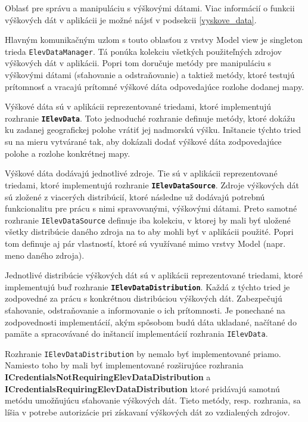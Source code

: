 Oblasť pre správu a manipuláciu s výškovými dátami. Viac informácií o funkcii výškových dát v aplikácii je možné nájsť v podsekcii \ref{vyskove_data}. 

Hlavným komunikačným uzlom s touto oblasťou z vrstvy Model view je singleton trieda \texttt{ElevDataManager}. Tá ponúka kolekciu všetkých použiteľných zdrojov výškových dát v aplikácii. Popri tom doručuje metódy pre manipuláciu s výškovými dátami (sťahovanie a odstraňovanie) a taktiež metódy, ktoré testujú prítomnosť a vracajú prítomné výškové dáta odpovedajúce rozlohe dodanej mapy.

\bigskip

Výškové dáta sú v aplikácii reprezentované triedami, ktoré implementujú rozhranie \textbf{\texttt{IElevData}}. Toto jednoduché rozhranie definuje metódy, ktoré dokážu ku zadanej geografickej polohe vrátiť jej nadmorskú výšku. Inštancie týchto tried su na mieru vytvárané tak, aby dokázali dodať výškové dáta zodpovedajúce polohe a rozlohe konkrétnej mapy. 

Výškové dáta dodávajú jednotlivé zdroje. Tie sú v aplikácii reprezentované triedami, ktoré implementujú rozhranie \textbf{\texttt{IElevDataSource}}. Zdroje výškových dát sú zložené z viacerých distribúcií, ktoré následne už dodávajú potrebnú funkcionalitu pre prácu s nimi spravovanými, výškovými dátami. Preto samotné rozhranie \texttt{IElevDataSource} definuje iba kolekciu, v ktorej by mali byť uložené všetky distribúcie daného zdroja na to aby mohli byť v aplikácii použité. Popri tom definuje aj pár vlastností, ktoré sú využívané mimo vrstvy Model (napr. meno daného zdroja).

Jednotlivé distribúcie výškových dát sú v aplikácii reprezentované triedami, ktoré implementujú buď rozhranie \textbf{\texttt{IElevDataDistribution}}. Každá z týchto tried je zodpovedné za prácu s konkrétnou distribúciou výškových dát. Zabezpečujú sťahovanie, odstraňovanie a informovanie o ich prítomnosti. Je ponechané na zodpovednosti implementácií, akým spôsobom budú dáta ukladané, načítané do pamäte a spracovávané do inštancií implementácií rozhrania \texttt{IElevData}.

Rozhranie \texttt{IElevDataDistribution} by nemalo byť implementované priamo. Namiesto toho by mali byť implementované rozširujúce rozhrania \textbf{ICredentialsNotRequiringElevDataDistribution} a \textbf{ICredentialsRequiringElevDataDistribution} ktoré pridávajú samotnú metódu umožňujúcu sťahovanie výškových dát. Tieto metódy, resp. rozhrania, sa líšia v potrebe autorizácie pri získavaní výškových dát zo vzdialených zdrojov.  

